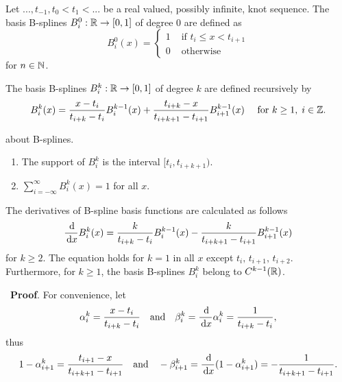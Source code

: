 \begin{definition}\label{Bspline}
Let $...,t_{-1},t_0<t_1<...$ be a real valued, possibly infinite, knot sequence. The basis B-splines $B_i^0: \mathbb R \to [0,1]$ of degree 0 are defined as
\begin{equation}
  B_i^0(x) = 
  \begin{cases}
    1 & \mbox{ if } t_i\leq x < t_{i+1}\\
    0 & \mbox{ otherwise}
  \end{cases}
\end{equation}
for $n\in\mathbb N$.

The basis B-splines $B_i^k:\mathbb R\to [0,1]$ of degree $k$ are defined recursively by
\begin{equation}
  B_i^k(x) = \frac{x-t_i}{t_{i+k}-t_i} B_i^{k-1}(x) + \frac{t_{i+k}-x}{t_{i+k+1}-t_{i+1}} B_{i+1}^{k-1}(x) \quad \text{ for } k\geq 1,\;i\in \Z.\label{recurDef}
\end{equation}
\end{definition}
\vspace{0.5cm}
\begin{remark} about B-splines.
  \begin{enumerate}
    \item The support of $B_i^k$ is the interval $[t_i,t_{i+k+1})$.
    \item $\displaystyle\sum_{i=-\infty}^\infty B_i^k(x) = 1$ for all $x$.\label{property2}
  \end{enumerate}
\end{remark}
\vspace{0.5cm}
\begin{lemma}\label{derBspline}
  The derivatives of B-spline basis functions are calculated as follows
  \begin{equation}
    \frac{\df}{\df x} B_i^k(x) = \frac{k}{t_{i+k}-t_i}B_i^{k-1}(x) - \frac{k}{t_{i+k+1}-t_{i+1}}B_{i+1}^{k-1}(x)\label{DerBspline}
  \end{equation}
  for $k\geq 2$. The equation holds for $k=1$ in all $x$ except $t_i,\,t_{i+1},\,t_{i+2}$.
  Furthermore, for $k\geq 1$, the basis B-splines $B_i^k$ belong to $C^{k-1}(\mathbb R)$.
\end{lemma}\
\textbf{Proof}. For convenience, let 
\[
  \alpha_i^k = \frac{x-t_i}{t_{i+k}-t_{i}} \quad\mbox{and}\quad \beta_i^k = \frac{\,{\rm d}}{\,{\rm d} x} \alpha_i^k = \frac{1}{t_{i+k}-t_{i}},
\]
thus
\[
  1-\alpha_{i+1}^k = \frac{t_{i+1}-x}{t_{i+k+1}-t_{i+1}} \quad\mbox{and}\quad -\beta_{i+1}^k = \frac{\,{\rm d}}{\,{\rm d} x} (1-\alpha_{i+1}^k) = -\frac{1}{t_{i+k+1}-t_{i+1}}.
\]

